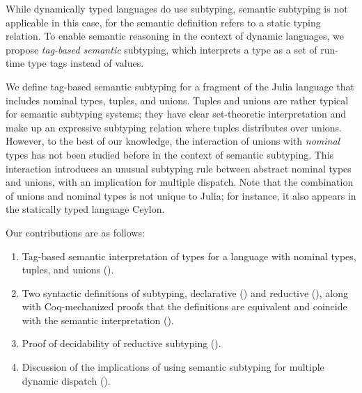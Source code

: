 While dynamically typed languages do use subtyping,
semantic subtyping is not applicable in this case,
for the semantic definition refers to a static typing relation.
To enable semantic reasoning in the context of dynamic languages,
we propose \emph{tag-based semantic} subtyping,
which interprets a type as a set of run-time type tags 
instead of values. %

We define tag-based semantic subtyping for a fragment of the Julia language 
that includes nominal types, tuples, and unions.
Tuples and unions are rather typical for semantic subtyping systems;
they have clear set-theoretic interpretation 
and make up an expressive subtyping relation
where tuples distributes over unions.
However, to the best of our knowledge,
the interaction of unions with \emph{nominal} types has not been studied before
in the context of semantic subtyping.
This interaction introduces
an unusual subtyping rule between abstract nominal types and unions,
with an implication for multiple dispatch.
Note that the combination of unions and nominal types is not unique to Julia;
for instance, it also appears in the statically typed language Ceylon.

Our contributions are as follows:
\begin{enumerate}
  \item Tag-based semantic interpretation of types for a language
    with nominal types, tuples, and unions ().
  \item Two syntactic definitions of subtyping, 
    declarative () and reductive (),
    along with Coq-mechanized proofs that the definitions are equivalent
    and coincide with the semantic interpretation (). 	
  \item Proof of decidability of reductive subtyping ().
  \item Discussion of the implications of using semantic subtyping
    for multiple dynamic dispatch ().
\end{enumerate}






